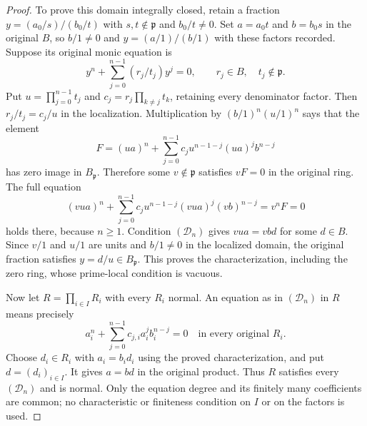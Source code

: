 \begin{proof}
To prove this domain integrally closed, retain a fraction
$y=(a_0/s)/(b_0/t)$ with $s,t\notin\mathfrak p$ and
$b_0/t\ne0$. Set $a=a_0t$ and $b=b_0s$ in the original $B$,
so $b/1\ne0$ and $y=(a/1)/(b/1)$ with these factors recorded.
Suppose its original monic equation is
$$
y^n+\sum_{j=0}^{n-1}(r_j/t_j)y^j=0,
\qquad r_j\in B,\quad t_j\notin\mathfrak p.
$$
Put $u=\prod_{j=0}^{n-1}t_j$ and
$c_j=r_j\prod_{k\ne j}t_k$, retaining every denominator factor.
Then $r_j/t_j=c_j/u$ in the localization. Multiplication by
$(b/1)^n(u/1)^n$ says that the element
$$
F=(ua)^n+\sum_{j=0}^{n-1}c_j u^{n-1-j}(ua)^jb^{n-j}
$$
has zero image in $B_{\mathfrak p}$. Therefore some
$v\notin\mathfrak p$ satisfies $vF=0$ in the original ring.
The full equation
$$
(vua)^n+\sum_{j=0}^{n-1}c_j u^{n-1-j}(vua)^j(vb)^{n-j}
=v^nF=0
$$
holds there, because $n\geq1$. Condition $(\mathcal D_n)$ gives
$vua=vbd$ for some $d\in B$. Since $v/1$ and $u/1$ are units
and $b/1\ne0$ in the localized domain, the original fraction
satisfies $y=d/u\in B_{\mathfrak p}$. This proves the characterization,
including the zero ring, whose prime-local condition is vacuous.

Now let $R=\prod_{i\in I}R_i$ with every $R_i$ normal.
An equation as in $(\mathcal D_n)$ in $R$ means precisely
$$
a_i^n+\sum_{j=0}^{n-1}c_{j,i}a_i^jb_i^{n-j}=0
\quad\text{in every original }R_i.
$$
Choose $d_i\in R_i$ with $a_i=b_id_i$ using the proved
characterization, and put $d=(d_i)_{i\in I}$. It gives $a=bd$
in the original product. Thus $R$ satisfies every $(\mathcal D_n)$
and is normal. Only the equation degree and its finitely many
coefficients are common; no characteristic or finiteness condition
on $I$ or on the factors is used.


\end{proof}
